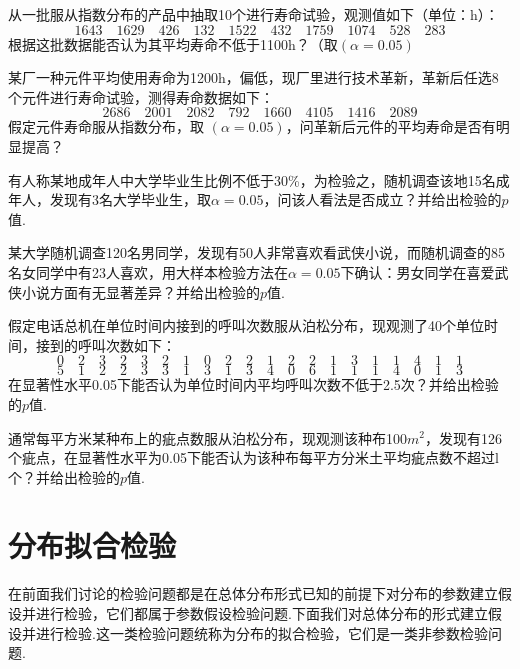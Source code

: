 \begin{xiti}
	\item 从一批服从指数分布的产品中抽取10个进行寿命试验，观测值如下（单位：h）：
	\[1643 \quad 1629 \quad 426 \quad 132 \quad 1522 \quad 432 \quad 1759 \quad 1074 \quad 528 \quad 283\]
	根据这批数据能否认为其平均寿命不低于1100h？（取$(\alpha=0.05)$
		
	\item 某厂一种元件平均使用寿命为1200h，偏低，现厂里进行技术革新，革新后任选8个元件进行寿命试验，测得寿命数据如下：
	\[2686 \quad 2001 \quad 2082 \quad 792 \quad 1660 \quad 4105 \quad 1416 \quad 2089\]
	假定元件寿命服从指数分布，取 $(\alpha=0.05)$，问革新后元件的平均寿命是否有明显提高？
	
	\item 有人称某地成年人中大学毕业生比例不低于30\%，为检验之，随机调查该地15名成年人，发现有3名大学毕业生，取$\alpha=0.05$，问该人看法是否成立？并给出检验的$p$值.
		
	\item 某大学随机调查120名男同学，发现有50人非常喜欢看武侠小说，而随机调查的85名女同学中有23人喜欢，用大样本检验方法在$\alpha=0.05$下确认：男女同学在喜爱武侠小说方面有无显著差异？并给出检验的$p$值.
	
			
	\item 假定电话总机在单位时间内接到的呼叫次数服从泊松分布，现观测了40个单位时间，接到的呼叫次数如下：
	\[0 \quad 2 \quad 3 \quad 2 \quad 3 \quad 2 \quad 1 \quad 0 \quad 2 \quad 2 \quad 1 \quad 2 \quad 2 \quad 1 \quad 3 \quad 1 \quad 1 \quad 4 \quad 1 \quad 1\]
	\[5 \quad 1 \quad 2 \quad 2 \quad 3 \quad 3 \quad 1 \quad 3 \quad 1 \quad 3 \quad 4 \quad 0 \quad 6 \quad 1 \quad 1 \quad 1 \quad 4 \quad 0 \quad 1 \quad 3\]
	在显著性水平0.05下能否认为单位时间内平均呼叫次数不低于2.5次？并给出检验的$p$值.
				
	\item 通常每平方米某种布上的疵点数服从泊松分布，现观测该种布100$m^{2}$，发现有126个疵点，在显著性水平为0.05下能否认为该种布每平方分米土平均疵点数不超过l个？并给出检验的$p$值.
\end{xiti}
\section{分布拟合检验\label{sec:7.4}}
在前面我们讨论的检验问题都是在总体分布形式已知的前提下对分布的参数建立假设并进行检验，它们都属于参数假设检验问题.下面我们对总体分布的形式建立假设并进行检验.这一类检验问题统称为分布的拟合检验，它们是一类非参数检验问题.

